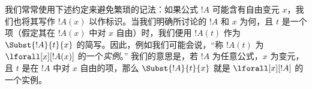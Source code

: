\documentclass[../../../include/open-logic-section]{subfiles}
\begin{document}
我们常常使用下述约定来避免繁琐的记法：如果公式 $!A$ 可能含有自由变元 $x$，我们也将其写作 $!A(x)$ 以作标识。当我们明确所讨论的 $!A$ 和 $x$ 为何，且 $t$ 是一个项（假定其在 $!A(x)$ 中对 $x$ 自由）时，我们便用 $!A(t)$ 作为 $\Subst{!A}{t}{x}$ 的简写。因此，例如我们可能会说，“称 $!A(t)$ 为 $\lforall[x][!A(x)]$ 的一个\emph{实例}。” 我们的意思是，若 $!A$ 为任意公式，$x$ 为变元，且 $t$ 是在 $!A$ 中对 $x$ 自由的项，那么 $\Subst{!A}{t}{x}$ 就是 $\lforall[x][!A]$ 的一个实例。
\end{document}
